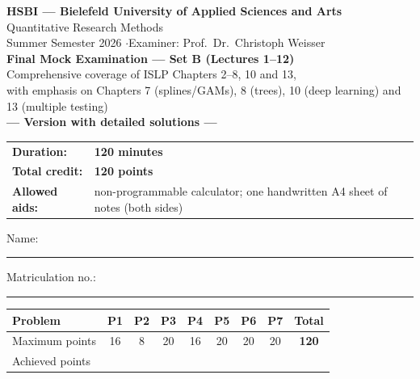 \documentclass[11pt,a4paper]{article}
\begin{document}
\begin{center}
  {\Large\textbf{HSBI --- Bielefeld University of Applied Sciences and Arts}}\\[1.2mm]
  {\large Quantitative Research Methods}\\[1mm]
  {\normalsize Summer Semester 2026 \quad$\cdot$\quad Examiner: Prof.\ Dr.\ Christoph Weisser}\\[4.5mm]
  {\LARGE\textbf{Final Mock Examination --- Set B (Lectures 1--12)}}\\[1.2mm]
  {\normalsize Comprehensive coverage of ISLP Chapters 2--8, 10 and 13,\\
   with emphasis on Chapters 7 (splines/GAMs), 8 (trees), 10 (deep learning) and 13 (multiple testing)}%
  \ifdefined\withsolutions\\[2.2mm]{\large\textcolor{teal!55!black}{\textbf{--- Version with detailed solutions ---}}}\fi
\end{center}

\vspace{2.5mm}
\begin{center}
\begin{tabular}{@{}ll@{}}
  \textbf{Duration:} & \textbf{120 minutes}\\
  \textbf{Total credit:} & \textbf{120 points}\\
  \textbf{Allowed aids:} & non-programmable calculator; one handwritten A4 sheet of notes (both sides)\\
\end{tabular}
\end{center}

\vspace{3mm}
Name: \rule[-1mm]{0.38\textwidth}{0.4pt}\hfill Matriculation no.: \rule[-1mm]{0.24\textwidth}{0.4pt}

\vspace{4.5mm}
\begin{center}
\renewcommand{\arraystretch}{1.35}
\begin{tabular}{|l|c|c|c|c|c|c|c|c|}
\hline
\textbf{Problem} & \textbf{P1} & \textbf{P2} & \textbf{P3} & \textbf{P4} & \textbf{P5} & \textbf{P6} & \textbf{P7} & \textbf{Total}\\\hline
Maximum points & 16 & 8 & 20 & 16 & 20 & 20 & 20 & \textbf{120}\\\hline
Achieved points & \hspace{8mm} & \hspace{8mm} & \hspace{8mm} & \hspace{8mm} & \hspace{8mm} & \hspace{8mm} & \hspace{8mm} & \hspace{10mm}\\\hline
\end{tabular}
\end{center}
\end{document}
